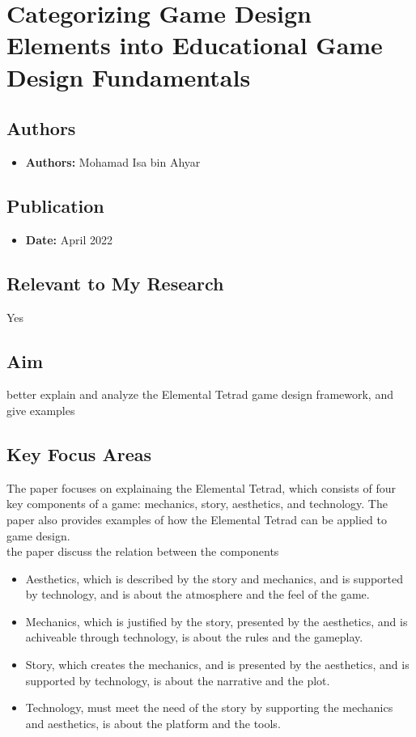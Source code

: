\section{Categorizing Game Design Elements into Educational Game Design Fundamentals}

\subsection{Authors}
\begin{itemize}
    \item \textbf{Authors:} Mohamad Isa bin Ahyar
\end{itemize}

\subsection{Publication}
\begin{itemize}
    \item \textbf{Date:} April 2022
\end{itemize}

\subsection{Relevant to My Research}
Yes

\subsection{Aim}
better explain and analyze the Elemental Tetrad game design framework, and give examples

\subsection{Key Focus Areas}
The paper focuses on explainaing the Elemental Tetrad, which consists of four key components of a game: mechanics, story, aesthetics, and technology. The paper also provides examples of how the Elemental Tetrad can be applied to game design.
\\
the paper discuss the relation between the components
\begin{itemize}
    \item Aesthetics, which is described by the story and mechanics, and is supported by technology, and is about the atmosphere and the feel of the game.
    \item Mechanics, which is justified by the story, presented by the aesthetics, and is achiveable through technology, is about the rules and the gameplay.
    \item Story, which creates the mechanics, and is presented by the aesthetics, and is supported by technology, is about the narrative and the plot.
    \item Technology, must meet the need of the story by supporting the mechanics and aesthetics, is about the platform and the tools.
\end{itemize}

